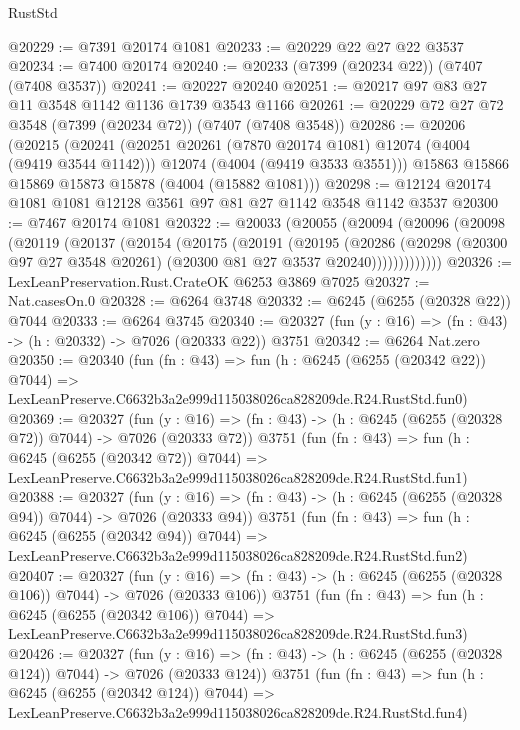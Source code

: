 \begin{lexlean}{RustStd}
\begin{coremodule}
@20229 := @7391 @20174 @1081
@20233 := @20229 @22 @27 @22 @3537
@20234 := @7400 @20174
@20240 := @20233 (@7399 (@20234 @22)) (@7407 (@7408 @3537))
@20241 := @20227 @20240
@20251 := @20217 @97 @83 @27 @11 @3548 @1142 @1136 @1739 @3543 @1166
@20261 := @20229 @72 @27 @72 @3548 (@7399 (@20234 @72)) (@7407 (@7408 @3548))
@20286 := @20206
    (@20215
      (@20241
        (@20251 @20261 (@7870 @20174 @1081) @12074 (@4004 (@9419 @3544 @1142)))
        @12074
        (@4004 (@9419 @3533 @3551)))
      @15863
      @15866
      @15869
      @15873
      @15878
      (@4004 (@15882 @1081)))
@20298 := @12124 @20174 @1081 @1081 @12128 @3561 @97 @81 @27 @1142 @3548 @1142 @3537
@20300 := @7467 @20174 @1081
@20322 := @20033
    (@20055
      (@20094
        (@20096
          (@20098
            (@20119
              (@20137
                (@20154
                  (@20175
                    (@20191
                      (@20195
                        (@20286
                          (@20298
                            (@20300 @97 @27 @3548 @20261)
                            (@20300 @81 @27 @3537 @20240)))))))))))))
@20326 := LexLeanPreservation.Rust.CrateOK @6253 @3869 @7025
@20327 := Nat.casesOn.{0}
@20328 := @6264 @3748
@20332 := @6245 (@6255 (@20328 @22)) @7044
@20333 := @6264 @3745
@20340 := @20327 (fun (y : @16) => (fn : @43) -> (h : @20332) -> @7026 (@20333 @22)) @3751
@20342 := @6264 Nat.zero
@20350 := @20340
    (fun (fn : @43) =>
    fun (h : @6245 (@6255 (@20342 @22)) @7044) =>
    LexLeanPreserve.C6632b3a2e999d115038026ca828209de.R24.RustStd.fun0)
@20369 := @20327
    (fun (y : @16) => (fn : @43) -> (h : @6245 (@6255 (@20328 @72)) @7044) -> @7026 (@20333 @72))
    @3751
    (fun (fn : @43) =>
    fun (h : @6245 (@6255 (@20342 @72)) @7044) =>
    LexLeanPreserve.C6632b3a2e999d115038026ca828209de.R24.RustStd.fun1)
@20388 := @20327
    (fun (y : @16) => (fn : @43) -> (h : @6245 (@6255 (@20328 @94)) @7044) -> @7026 (@20333 @94))
    @3751
    (fun (fn : @43) =>
    fun (h : @6245 (@6255 (@20342 @94)) @7044) =>
    LexLeanPreserve.C6632b3a2e999d115038026ca828209de.R24.RustStd.fun2)
@20407 := @20327
    (fun (y : @16) => (fn : @43) -> (h : @6245 (@6255 (@20328 @106)) @7044) -> @7026 (@20333 @106))
    @3751
    (fun (fn : @43) =>
    fun (h : @6245 (@6255 (@20342 @106)) @7044) =>
    LexLeanPreserve.C6632b3a2e999d115038026ca828209de.R24.RustStd.fun3)
@20426 := @20327
    (fun (y : @16) => (fn : @43) -> (h : @6245 (@6255 (@20328 @124)) @7044) -> @7026 (@20333 @124))
    @3751
    (fun (fn : @43) =>
    fun (h : @6245 (@6255 (@20342 @124)) @7044) =>
    LexLeanPreserve.C6632b3a2e999d115038026ca828209de.R24.RustStd.fun4)

\end{coremodule}
\end{lexlean}
